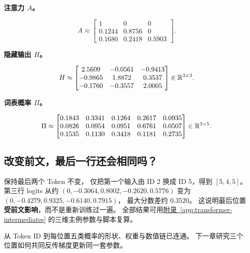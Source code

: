 \noindent\textbf{注意力 $A$。}\par
\begin{equation}
\boxed{A\approx\begin{bmatrix}
1&0&0\\
0.1244&0.8756&0\\
0.1680&0.2418&0.5903
\end{bmatrix}.}
\end{equation}

\noindent\textbf{隐藏输出 $H$。}\par
\begin{equation}
H\approx\begin{bmatrix}
2.5609&-0.0561&-0.9413\\
-0.9865&1.8872&0.3537\\
-0.1760&-0.3557&2.0005
\end{bmatrix}\in\mathbb{R}^{3\times3}.
\end{equation}

\noindent\textbf{词表概率 $\Pi$。}\par
\begin{equation}
\Pi\approx\begin{bmatrix}
0.1843&0.3341&0.1264&0.2617&0.0935\\
0.0826&0.0954&0.0951&0.6761&0.0507\\
0.1535&0.1130&0.3418&0.1181&0.2735
\end{bmatrix}\in\mathbb{R}^{3\times5}.
\end{equation}


\subsection{改变前文，最后一行还会相同吗？}

保持最后两个 Token 不变，
仅把第一个输入由 ID 2 换成 ID 5，得到 $[5,4,5]$。
第三行 logits 从约
$(0,-0.3064,0.8002,-0.2620,0.5776)$
变为
$(0,-0.4279,0.9325,-0.6140,0.7915)$，
最大分数差约 $0.3520$。
这说明最后位置\textbf{受前文影响}，而不是重新训练过一遍。
全部结果可用\hyperref[app:transformer-intermediates]{附录~\ref*{app:transformer-intermediates}} 的三维主例参数与脚本复算。



\par\smallskip
从 Token ID 到每位置五类概率的形状、权重与数值链已连通。
下一章研究三个位置如何共同反传梯度更新同一套参数。
